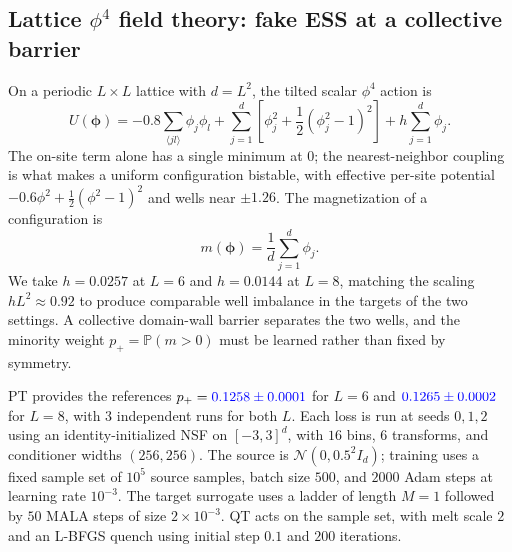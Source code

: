 \documentclass{article}
\begin{document}
\subsection{Lattice \texorpdfstring{$\phi^4$}{phi4} field theory: fake ESS at a collective barrier}
\label{subsec: phi4}
On a periodic $L\times L$ lattice with $d=L^2$, the tilted scalar $\phi^4$ action is
\begin{equation*}
U(\boldsymbol\phi)
=-0.8\sum_{\langle jl\rangle}\phi_j\phi_l
+\sum_{j=1}^{d}\left[\phi_j^2+\frac12(\phi_j^2-1)^2\right]
+h\sum_{j=1}^{d}\phi_j.
\end{equation*}
The on-site term alone has a single minimum at $0$; the nearest-neighbor coupling is what makes a uniform configuration bistable, with effective per-site potential $-0.6\phi^2+\frac12(\phi^2-1)^2$ and wells near $\pm1.26$. The magnetization of a configuration is
\begin{equation*}
    m(\boldsymbol\phi)=\frac1d\sum_{j=1}^{d}\phi_j .
\end{equation*}
We take $h=0.0257$ at $L=6$ and $h=0.0144$ at $L=8$, matching the scaling $hL^2\approx0.92$ to produce comparable well imbalance in the targets of the two settings.
A collective domain-wall barrier separates the two wells, and the minority weight $p_+=\mathbb P(m>0)$ must be learned rather than fixed by symmetry.

{\color{blue}PT provides} the references $p_+={\color{blue}0.1258\pm0.0001}$ for $L=6$ and ${\color{blue}0.1265\pm0.0002}$ for $L=8${\color{blue}, with 3 independent runs for both $L$}. Each loss is run at seeds $0,1,2$ using an identity-initialized NSF on $[-3,3]^d$, with $16$ bins, $6$ transforms, and conditioner widths $(256,256)$. The source is $\mathcal N(0,0.5^2 I_d)$; training uses a fixed sample set of $10^5$ source samples, batch size $500$, and $2000$ Adam steps at learning rate $10^{-3}$. The target surrogate uses a ladder of length $M=1$ followed by $50$ MALA steps of size $2\times10^{-3}$. {\color{blue}QT acts} on the sample set, with melt scale $2$ and an L-BFGS quench using initial step $0.1$ and $200$ iterations.
\end{document}
